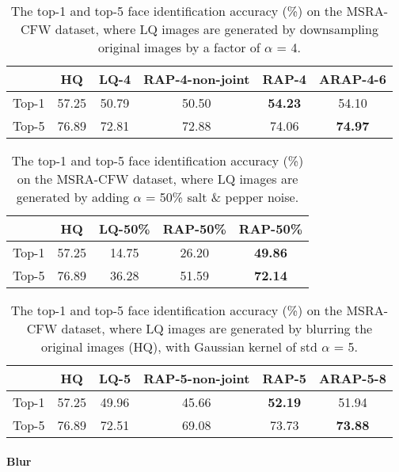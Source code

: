 \documentclass[10pt,twocolumn,twoside]{IEEEtran} %
\begin{document}
\begin{table}
	\fontsize{10pt}{12pt}\selectfont
	\caption{The top-1 and top-5 face identification accuracy (\%) on the MSRA-CFW dataset, where LQ images are generated by downsampling original images by a factor of $\alpha$ = 4.}
	\begin{center}
		\begin{tabular}{@{\hskip 1mm}c@{\hskip 1mm}|@{\hskip 1mm}c@{\hskip 1mm}|@{\hskip 1mm}c@{\hskip 1mm}|@{\hskip 1mm}c@{\hskip 1mm}|@{\hskip 1mm}c@{\hskip 1mm}|@{\hskip 1mm}c@{\hskip 1mm}}
			\hline
			& HQ & LQ-4 & RAP-4-non-joint & RAP-4 & ARAP-4-6\\ \hline
			\hline
			Top-1  & 57.25 & 50.79 & 50.50 & \textbf{54.23} & 54.10\\ 
			Top-5  & 76.89 & 72.81 & 72.88 & 74.06 & \textbf{74.97}\\ \hline
		\end{tabular}
	\end{center}
	
	\label{msralr}
\end{table}\begin{table}
	\fontsize{10pt}{12pt}\selectfont
	\caption{The top-1 and top-5 face identification accuracy (\%) on the MSRA-CFW dataset, where LQ images are generated by adding $\alpha$ = 50\% salt \& pepper noise.}
	\begin{center}
		\begin{tabular}{c|c|c|c|c}
			\hline
			& HQ & LQ-50\% & RAP-50\% & RAP-50\% \\ \hline
			\hline
			Top-1  & 57.25 & 14.75 & 26.20 & \textbf{49.86} \\ 
			Top-5  & 76.89 & 36.28 & 51.59 & \textbf{72.14} \\ \hline
		\end{tabular}
	\end{center}
	
	\label{msrasalt}
\end{table}\begin{table}
	\fontsize{10pt}{12pt}\selectfont
	\caption{The top-1 and top-5 face identification accuracy (\%) on the MSRA-CFW dataset, where LQ images are generated by blurring the original images (HQ), with Gaussian kernel of std $\alpha$ = 5.}
	\begin{center}
		\begin{tabular}{@{\hskip 1mm}c@{\hskip 1mm}|@{\hskip 1mm}c@{\hskip 1mm}|@{\hskip 1mm}c@{\hskip 1mm}|@{\hskip 1mm}c@{\hskip 1mm}|@{\hskip 1mm}c@{\hskip 1mm}|@{\hskip 1mm}c@{\hskip 1mm}}
			\hline
			& HQ & LQ-5 & RAP-5-non-joint & RAP-5 & ARAP-5-8 \\ \hline
			\hline
			Top-1  & 57.25 & 49.96 & 45.66 & \textbf{52.19} & 51.94\\ 
			Top-5  & 76.89 & 72.51 & 69.08 & 73.73 & \textbf{73.88}\\ \hline
		\end{tabular}
	\end{center}
	
	\label{msrablur}
\end{table}\paragraph{Blur}%
\end{document}
